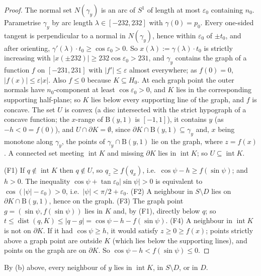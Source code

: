 \documentclass[11pt]{amsart}
\theoremstyle{definition}
\theoremstyle{remark}
\newcommand{\eps}{\varepsilon}
\newcommand{\dist}{\operatorname{dist}}
\newcommand{\Dd}{\mathrm{B}}      %
\begin{document}
\begin{proof}
The normal set $N(\gamma_y)$ is an arc of $S^1$ of length at most $\eps_0$ containing $n_0$. Parametrise $\gamma_y$ by arc length $\lambda\in[-232,232]$ with $\gamma(0)=p_0$. Every one-sided tangent is perpendicular to a normal in $N(\gamma_y)$, hence within $\eps_0$ of $\pm t_0$, and after orienting, $\gamma'(\lambda)\cdot t_0\ge\cos\eps_0>0$. So $x(\lambda):=\gamma(\lambda)\cdot t_0$ is strictly increasing with $|x(\pm232)|\ge232\cos\eps_0>231$, and $\gamma_y$ contains the graph of a function $f$ on $[-231,231]$ with $|f'|\le\eps$ almost everywhere; as $f(0)=0$, $|f(x)|\le\eps|x|$. Also $f\le0$ because $K\subseteq H_0$. At each graph point the outer normals have $n_0$-component at least $\cos\eps_0>0$, and $K$ lies in the corresponding supporting half-plane; so $K$ lies below every supporting line of the graph, and $f$ is concave. The set $U$ is convex (a disc intersected with the strict hypograph of a concave function; the $x$-range of $\Dd(y,1)$ is $[-1,1]$), it contains $y$ (as $-h<0=f(0)$), and $U\cap\partial K=\emptyset$, since $\partial K\cap\Dd(y,1)\subseteq\gamma_y$ and, $x$ being monotone along $\gamma_y$, the points of $\gamma_y\cap\Dd(y,1)$ lie on the graph, where $z=f(x)$. A connected set meeting $\operatorname{int}K$ and missing $\partial K$ lies in $\operatorname{int}K$; so $U\subseteq\operatorname{int}K$.

(F1) If $q\notin\operatorname{int}K$ then $q\notin U$, so $q_z\ge f(q_x)$, i.e.\ $\cos\psi-h\ge f(\sin\psi)$; and $h>0$. The inequality $\cos\psi+\tan\eps_0|\sin\psi|>0$ is equivalent to $\cos(|\psi|-\eps_0)>0$, i.e.\ $|\psi|<\pi/2+\eps_0$. (F2) A neighbour in $S\setminus D$ lies on $\partial K\cap\Dd(y,1)$, hence on the graph. (F3) The graph point $g=(\sin\psi,f(\sin\psi))$ lies in $K$ and, by (F1), directly below $q$; so $t\le\dist(q,K)\le|q-g|=\cos\psi-h-f(\sin\psi)$. (F4) A neighbour in $\operatorname{int}K$ is not on $\partial K$. If it had $\cos\psi\ge h$, it would satisfy $z\ge0\ge f(x)$; points strictly above a graph point are outside $K$ (which lies below the supporting lines), and points on the graph are on $\partial K$. So $\cos\psi-h<f(\sin\psi)\le0$.
\end{proof}
By (b) above, every neighbour of $y$ lies in $\operatorname{int}K$, in $S\setminus D$, or in $D$.
\end{document}
